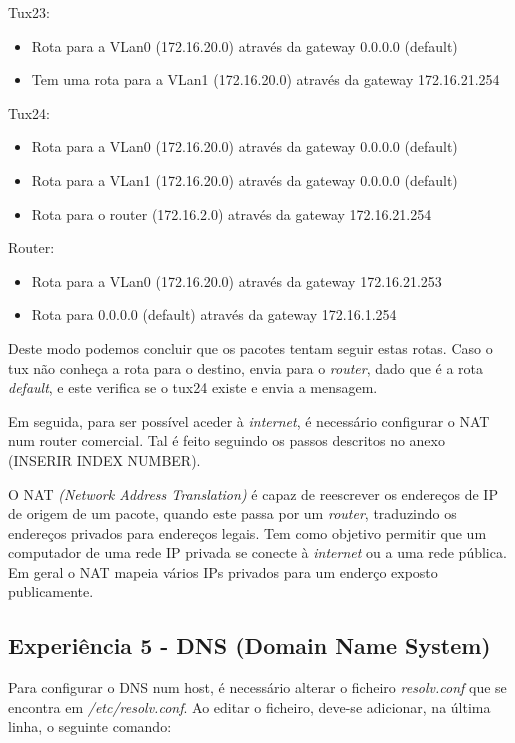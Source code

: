 \documentclass[11pt]{article}
\begin{document}
Tux23:
\begin{itemize}
\item Rota para a VLan0 (172.16.20.0) através da gateway 0.0.0.0 (default)
\item Tem uma rota para a VLan1 (172.16.20.0) através da gateway 172.16.21.254
\end{itemize}

Tux24:
\begin{itemize}
\item Rota para a VLan0 (172.16.20.0) através da gateway 0.0.0.0 (default)
\item Rota para a VLan1 (172.16.20.0) através da gateway 0.0.0.0 (default)
\item Rota para o router (172.16.2.0) através da gateway 172.16.21.254
\end{itemize}

Router:
\begin{itemize}
\item Rota para a VLan0 (172.16.20.0) através da gateway 172.16.21.253
\item Rota para 0.0.0.0 (default) através da gateway 172.16.1.254
\end{itemize}

Deste modo podemos concluir que os pacotes tentam seguir estas rotas. Caso o tux não conheça a rota para o destino, envia para o \textit{router}, dado que é a rota \textit{default}, e este verifica se o tux24 existe e envia a mensagem. 

Em seguida, para ser possível aceder à \textit{internet}, é necessário configurar o NAT num router comercial. Tal é feito seguindo os passos descritos no anexo (INSERIR INDEX NUMBER).

O NAT \emph{(Network Address Translation)} é capaz de reescrever os endereços de IP de origem de um pacote, quando este passa por um \textit{router}, traduzindo os endereços privados para endereços legais. Tem como objetivo permitir que um computador de uma rede IP privada se conecte à \textit{internet} ou a uma rede pública. Em geral o NAT mapeia vários IPs privados para um enderço exposto publicamente.

\subsection{Experiência 5 - DNS (Domain Name System)}

Para configurar o DNS num host, é necessário alterar o ficheiro \textit{resolv.conf} que se encontra em \textit{/etc/resolv.conf}. Ao editar o ficheiro, deve-se adicionar, na última linha, o seguinte comando:
\end{document}
